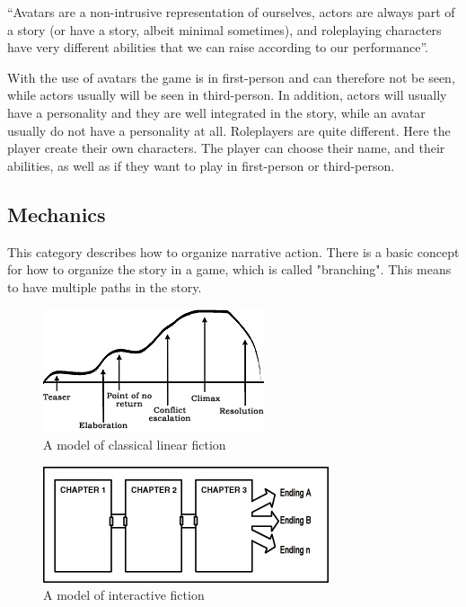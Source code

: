 “Avatars are a non-intrusive representation of ourselves, actors are always part of a story (or have a story, albeit minimal sometimes), and roleplaying characters have very different abilities that we can raise according to our performance”. \cite{understandingvg} 

With the use of avatars the game is in first-person and can therefore not be seen, while actors usually will be seen in third-person. In addition, actors will usually have a personality and they are well integrated in the story, while an avatar usually do not have a personality at all. Roleplayers are quite different. Here the player create their own characters. The player can choose their name, and their abilities, as well as if they want to play in first-person or third-person.  

\subsection{Mechanics}
This category describes how to organize narrative action. There is a basic concept for how to organize the story in a game, which is called "branching". This means to have multiple paths in the story. 

\begin{figure}
\begin{center}
\includegraphics[scale=1.0]{linearFiction}
\caption[Classical Linear Fiction]{A model of classical linear fiction \cite{understandingvg}}
\label{fig:linearfiction}
\end{center}
\end{figure} 
\begin{figure}
\begin{center}
\includegraphics[scale=1.0]{interactiveFiction}
\caption[Interactive Fiction]{A model of interactive fiction \cite{understandingvg}}
\label{fig:interactivefiction}
\end{center}
\end{figure} 

